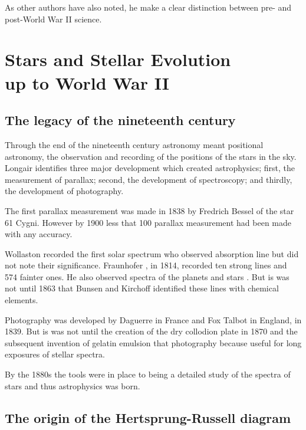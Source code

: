 As other authors have also noted, he make a clear distinction between
pre- and post-World War II science.


\section{Stars and Stellar Evolution\\ up to World War II}

\subsection{The legacy of the nineteenth century}

Through the end of the nineteenth century astronomy
meant positional astronomy, the observation and recording of the
positions of the stars in the sky.  Longair identifies three major
development which created astrophysics; first, the measurement of
parallax; second, the development of spectroscopy; and thirdly, the
development of photography.

The first parallax measurement was made
in 1838 by Fredrich Bessel \cite{Bessel1839} of the star 61
Cygni. However by 1900 less that 100 parallax measurement had been
made with any accuracy.

Wollaston \cite{Wollaston1802}
recorded  the first solar spectrum
who observed absorption line but did not note their significance.
Fraunhofer \cite{Fraunhofer1817}, in 1814, recorded ten strong lines
and 574 fainter ones. He also observed spectra of the planets and
stars \cite{Fraunhofer1823}. But is was not until 1863 that Bunsen
and Kirchoff \cite{Kirchoff1861} identified these lines with
chemical elements.

Photography was developed by Daguerre
in France and Fox Talbot in England, in 1839. But is was not until the
creation of the dry collodion plate in 1870 and the subsequent
invention of gelatin emulsion that photography because useful for long
exposures of stellar spectra.

By the 1880s the tools were in place to being a
detailed study of the spectra of stars and thus astrophysics was born.


\subsection{The origin of the Hertsprung-Russell diagram}


